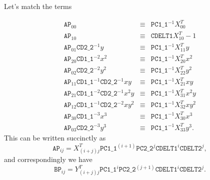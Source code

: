 \documentclass[10pt]{article}
\newcommand{\sipAP}[2]{\ensuremath{\mathtt{AP}_{#1 #2}}}
\newcommand{\sipBP}[2]{\ensuremath{\mathtt{BP}_{#1 #2}}}
\newcommand{\siafXP}[2]{\ensuremath{X^{T}_{#1 #2}}}
\newcommand{\siafYP}[2]{\ensuremath{Y^{T}_{#1 #2}}}
\newcommand{\NCu}{\ensuremath{\mathtt{PC1\_1}}}
\newcommand{\NCv}{\ensuremath{\mathtt{PC2\_2}}}
\newcommand{\CDu}{\ensuremath{\mathtt{CD1\_1}}}
\newcommand{\CDv}{\ensuremath{\mathtt{CD2\_2}}}
\begin{document}
Let's match the terms


\begin{eqnarray}
\label{eqn:matched_inv}
\sipAP{0}{0} &\equiv& \NCu^{-1} \siafXP{0}{0}\\
\sipAP{1}{0} &\equiv& \mathtt{CDELT1}\siafXP{1}{0} - 1 \\
\sipAP{0}{1} \CDv^{-1} y &\equiv& \NCu^{-1} \siafXP{1}{1} y \\
\sipAP{2}{0} \CDu^{-2} x^2 &\equiv& \NCu^{-1}  \siafXP{2}{0} x^2\\
\sipAP{0}{2} \CDv^{-2} y^2 &\equiv& \NCu^{-1} \siafXP{2}{2} y^2\\
\sipAP{1}{1} \CDu^{-1} \CDv^{-1} xy &\equiv&  \NCu^{-1} \siafXP{2}{1} xy \\
\sipAP{2}{1} \CDu^{-2}\CDv^{-1} x^2y &\equiv& \NCu^{-1} \siafXP{3}{1} x^2 y\\
\sipAP{1}{2} \CDu^{-1}\CDv^{-2} xy^2 &\equiv& \NCu^{-1} \siafXP{3}{2} xy^2 \\
\sipAP{3}{0} \CDu^{-3} x^3&\equiv& \NCu^{-1}  \siafXP{3}{0} x^3 \\
\sipAP{0}{3} \CDv^{-3} y^3&\equiv& \NCu^{-1}  \siafXP{3}{3} y^3.
\end{eqnarray}
\noindent
This can be written succinctly as
\begin{equation}
\sipAP{i}{j} = \siafXP{(i+j)}{j} \NCu^{(i+1)} \NCv^{j} \mathtt{CDELT1}^i \mathtt{CDELT2}^j,
\end{equation}
\noindent
and correspondingly we have
\begin{equation}
\sipBP{i}{j} = \siafYP{(i+j)}{j} \NCu^{i} \NCv^{(j+1)} \mathtt{CDELT1}^i \mathtt{CDELT2}^j.
\end{equation}
\end{document}
